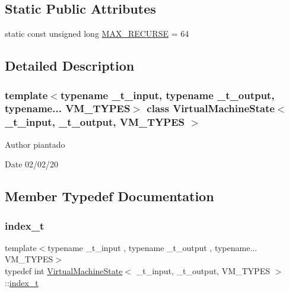 \subsection*{Static Public Attributes}
\begin{DoxyCompactItemize}
\item 
static const unsigned long \hyperlink{class_virtual_machine_state_a39865beb5e6573148615231897c677de}{M\+A\+X\+\_\+\+R\+E\+C\+U\+R\+SE} = 64
\end{DoxyCompactItemize}


\subsection{Detailed Description}
\subsubsection*{template$<$typename \+\_\+t\+\_\+input, typename \+\_\+t\+\_\+output, typename... V\+M\+\_\+\+T\+Y\+P\+ES$>$\newline
class Virtual\+Machine\+State$<$ \+\_\+t\+\_\+input, \+\_\+t\+\_\+output, V\+M\+\_\+\+T\+Y\+P\+E\+S $>$}

\begin{DoxyAuthor}{Author}
piantado 
\end{DoxyAuthor}
\begin{DoxyDate}{Date}
02/02/20 
\end{DoxyDate}


\subsection{Member Typedef Documentation}
\mbox{\label{class_virtual_machine_state_a95ba2f54f65b778c8a012ea3e7a0ee50}} 
\subsubsection{\texorpdfstring{index\+\_\+t}{index\_t}}
{\footnotesize\ttfamily template$<$typename \+\_\+t\+\_\+input , typename \+\_\+t\+\_\+output , typename... V\+M\+\_\+\+T\+Y\+P\+ES$>$ \\
typedef int \hyperlink{class_virtual_machine_state}{Virtual\+Machine\+State}$<$ \+\_\+t\+\_\+input, \+\_\+t\+\_\+output, V\+M\+\_\+\+T\+Y\+P\+ES $>$\+::\hyperlink{class_virtual_machine_state_a95ba2f54f65b778c8a012ea3e7a0ee50}{index\+\_\+t}}

